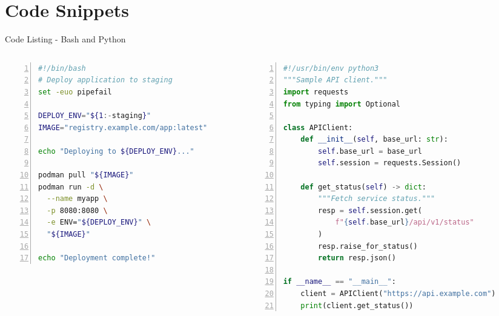 \section{Code Snippets}

\begin{frame}[fragile]{Code Listing - Bash and Python}
  \begin{columns}[T]
    \begin{column}{0.48\textwidth}
      \begin{lstlisting}[language=bash, numbers=left, basicstyle=\ttfamily\tiny, title={\tiny\bfseries Shell Script Example}]
#!/bin/bash
# Deploy application to staging
set -euo pipefail

DEPLOY_ENV="${1:-staging}"
IMAGE="registry.example.com/app:latest"

echo "Deploying to ${DEPLOY_ENV}..."

podman pull "${IMAGE}"
podman run -d \
  --name myapp \
  -p 8080:8080 \
  -e ENV="${DEPLOY_ENV}" \
  "${IMAGE}"

echo "Deployment complete!"
      \end{lstlisting}
    \end{column}
    \begin{column}{0.48\textwidth}
      \begin{lstlisting}[language=python, numbers=left, basicstyle=\ttfamily\tiny, title={\tiny\bfseries Python Example}]
#!/usr/bin/env python3
"""Sample API client."""
import requests
from typing import Optional

class APIClient:
    def __init__(self, base_url: str):
        self.base_url = base_url
        self.session = requests.Session()

    def get_status(self) -> dict:
        """Fetch service status."""
        resp = self.session.get(
            f"{self.base_url}/api/v1/status"
        )
        resp.raise_for_status()
        return resp.json()

if __name__ == "__main__":
    client = APIClient("https://api.example.com")
    print(client.get_status())
      \end{lstlisting}
    \end{column}
  \end{columns}
\end{frame}

